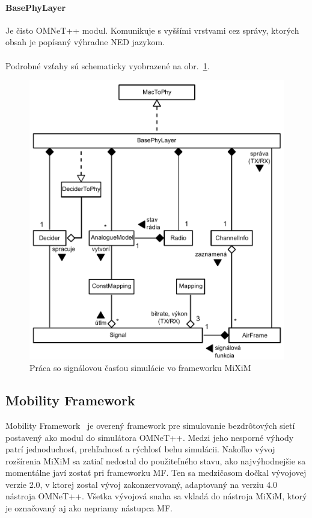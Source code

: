 \paragraph{BasePhyLayer}
\indent Je čisto OMNeT++ modul. Komunikuje s vyššími vrstvami cez správy, ktorých obsah je popísaný výhradne NED jazykom.\\ \\
\indent Podrobné vzťahy sú schematicky vyobrazené na obr.~\ref{fig:architecture_mixim}.\\
\begin{figure}[htbp]
\begin{center}
\includegraphics[width=140mm]{figures/architecture_mixim}
\caption{Práca so signálovou časťou simulácie vo frameworku MiXiM}
\label{fig:architecture_mixim}
\end{center}
\end{figure}
\subsection{Mobility Framework}
\indent\indent Mobility Framework~\cite{mf03} je overený framework pre simulovanie bezdrôtových sietí postavený ako modul do simulátora OMNeT++. Medzi jeho nesporné výhody patrí jednoduchosť, prehľadnosť a rýchlosť behu simulácii. Nakoľko vývoj rozšírenia MiXiM sa zatiaľ nedostal do použiteľného stavu, ako najvýhodnejšie sa momentálne javí zostať pri frameworku MF. Ten sa medzičasom dočkal vývojovej verzie 2.0, v ktorej zostal vývoj zakonzervovaný, adaptovaný na verziu 4.0 nástroja OMNeT++. Všetka vývojová snaha sa vkladá do nástroja MiXiM, ktorý je označovaný aj ako nepriamy nástupca MF.\\
